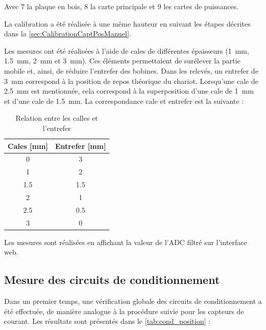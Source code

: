 Avec 7 la plaque en bois, 8 la carte principale et 9 les cartes de puissances.

La calibration a été réalisée à une même hauteur en suivant les étapes décrites dans la \autoref{sec:CalibrationCaptPosManuel}.

Les mesures ont été réalisées à l'aide de cales de différentes épaisseurs (1~mm, 1.5~mm, 2~mm et 3~mm). Ces éléments permettaient de surélever la partie mobile et, ainsi, de réduire l'entrefer des bobines. Dans les relevés, un entrefer de 3~mm correspond à la position de repos théorique du chariot. Lorsqu'une cale de 2.5~mm est mentionnée, cela correspond à la superposition d'une cale de 1~mm et d'une cale de 1.5~mm. La correspondance cale et entrefer est la suivante :

\begin{table}[H]
    \centering
    \begin{tabular}{cc}
        \toprule
        \textbf{Cales [mm]} & \textbf{Entrefer [mm]} \\
        \midrule
        0                   & 3                      \\
        1                   & 2                      \\
        1.5                 & 1.5                    \\
        2                   & 1                      \\
        2.5                 & 0.5                    \\
        3                   & 0                      \\
        \bottomrule
    \end{tabular}
    \caption{Relation entre les calles et l'entrefer}
    \label{tab:calles_entrefer}
\end{table}

Les mesures sont réalisées en affichant la valeur de l'ADC filtré sur l'interface web.

\subsection{Mesure des circuits de conditionnement}
Dans un premier temps, une vérification globale des circuits de conditionnement a été effectuée, de manière analogue à la procédure suivie pour les capteurs de courant. Les résultats sont présentés dans le \autoref{tab:cond_position} :

